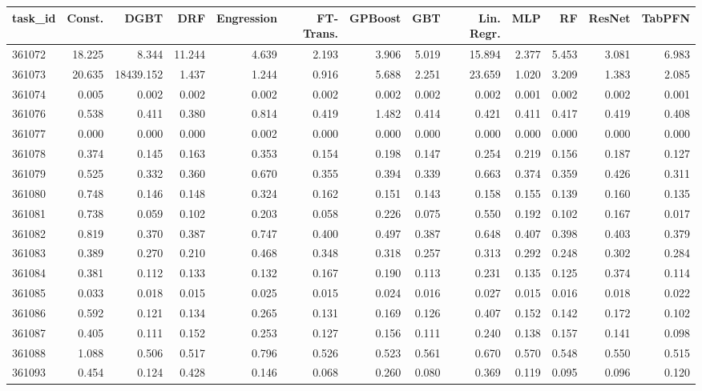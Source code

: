 \begin{tabular}{lrrrrrrrrrrrr}
\toprule
task\_id & Const. & DGBT & DRF & Engression & FT-Trans. & GPBoost & GBT & Lin. Regr. & MLP & RF & ResNet & TabPFN \\
\midrule
361072 & 18.225 & 8.344 & 11.244 & 4.639 & 2.193 & 3.906 & 5.019 & 15.894 & 2.377 & 5.453 & 3.081 & 6.983 \\
361073 & 20.635 & 18439.152 & 1.437 & 1.244 & 0.916 & 5.688 & 2.251 & 23.659 & 1.020 & 3.209 & 1.383 & 2.085 \\
361074 & 0.005 & 0.002 & 0.002 & 0.002 & 0.002 & 0.002 & 0.002 & 0.002 & 0.001 & 0.002 & 0.002 & 0.001 \\
361076 & 0.538 & 0.411 & 0.380 & 0.814 & 0.419 & 1.482 & 0.414 & 0.421 & 0.411 & 0.417 & 0.419 & 0.408 \\
361077 & 0.000 & 0.000 & 0.000 & 0.002 & 0.000 & 0.000 & 0.000 & 0.000 & 0.000 & 0.000 & 0.000 & 0.000 \\
361078 & 0.374 & 0.145 & 0.163 & 0.353 & 0.154 & 0.198 & 0.147 & 0.254 & 0.219 & 0.156 & 0.187 & 0.127 \\
361079 & 0.525 & 0.332 & 0.360 & 0.670 & 0.355 & 0.394 & 0.339 & 0.663 & 0.374 & 0.359 & 0.426 & 0.311 \\
361080 & 0.748 & 0.146 & 0.148 & 0.324 & 0.162 & 0.151 & 0.143 & 0.158 & 0.155 & 0.139 & 0.160 & 0.135 \\
361081 & 0.738 & 0.059 & 0.102 & 0.203 & 0.058 & 0.226 & 0.075 & 0.550 & 0.192 & 0.102 & 0.167 & 0.017 \\
361082 & 0.819 & 0.370 & 0.387 & 0.747 & 0.400 & 0.497 & 0.387 & 0.648 & 0.407 & 0.398 & 0.403 & 0.379 \\
361083 & 0.389 & 0.270 & 0.210 & 0.468 & 0.348 & 0.318 & 0.257 & 0.313 & 0.292 & 0.248 & 0.302 & 0.284 \\
361084 & 0.381 & 0.112 & 0.133 & 0.132 & 0.167 & 0.190 & 0.113 & 0.231 & 0.135 & 0.125 & 0.374 & 0.114 \\
361085 & 0.033 & 0.018 & 0.015 & 0.025 & 0.015 & 0.024 & 0.016 & 0.027 & 0.015 & 0.016 & 0.018 & 0.022 \\
361086 & 0.592 & 0.121 & 0.134 & 0.265 & 0.131 & 0.169 & 0.126 & 0.407 & 0.152 & 0.142 & 0.172 & 0.102 \\
361087 & 0.405 & 0.111 & 0.152 & 0.253 & 0.127 & 0.156 & 0.111 & 0.240 & 0.138 & 0.157 & 0.141 & 0.098 \\
361088 & 1.088 & 0.506 & 0.517 & 0.796 & 0.526 & 0.523 & 0.561 & 0.670 & 0.570 & 0.548 & 0.550 & 0.515 \\
361093 & 0.454 & 0.124 & 0.428 & 0.146 & 0.068 & 0.260 & 0.080 & 0.369 & 0.119 & 0.095 & 0.096 & 0.120 \\

\end{tabular}

